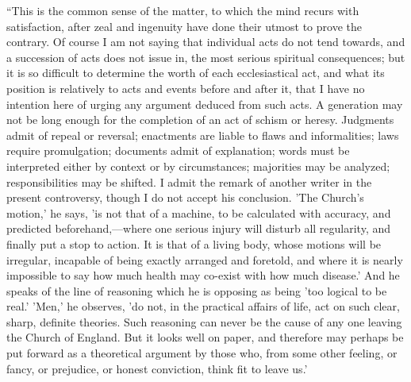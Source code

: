 ``This is the common sense of the matter, to which the mind
recurs with satisfaction, after zeal and ingenuity have done their
utmost to prove the contrary. Of course I am not saying that
individual acts do not tend towards, and a succession of acts does not
issue in, the most serious spiritual consequences; but it is so
difficult to determine the worth of each ecclesiastical act, and what
its position is relatively to acts and events before and after it,
that I have no intention here of urging any argument deduced from such
acts. A generation may not be long enough for the completion of an act
of schism or heresy. Judgments admit of repeal or reversal; enactments are liable to flaws and informalities; laws require
promulgation; documents admit of explanation; words must be
interpreted either by context or by circumstances; majorities may be
analyzed; responsibilities may be shifted. I admit the remark of
another writer in the present controversy, though I do not accept his
conclusion. 'The Church's motion,' he says, 'is not that of a machine,
to be calculated with accuracy, and predicted beforehand,—where one
serious injury will disturb all regularity, and finally put a stop to
action. It is that of a living body, whose motions will be irregular,
incapable of being exactly arranged and foretold, and where it is
nearly impossible to say how much health may co-exist with how much
disease.' And he speaks of the line of reasoning which he is opposing
as being 'too logical to be real.' 'Men,' he observes, 'do not, in the
practical affairs of life, act on such clear, sharp, definite
theories. Such reasoning can never be the cause of any one leaving the
Church of England. But it looks well on paper, and therefore may
perhaps be put forward as a theoretical argument by those who, from
some other feeling, or fancy, or prejudice, or honest conviction,
think fit to leave us.'

